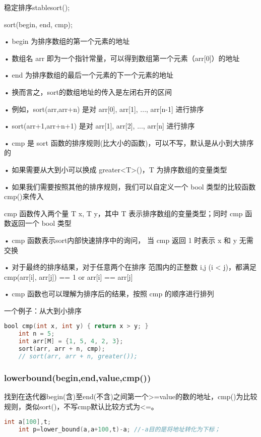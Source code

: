 \documentclass[UTF8]{ctexart}
\begin{document}
稳定排序stable\textunderscore sort();

sort(begin, end, cmp);

• begin 为排序数组的第一个元素的地址

• 数组名 arr 即为一个指针常量，可以得到数组第一个元素（arr[0]）的地址

• end 为排序数组的最后一个元素的下一个元素的地址

• 换而言之，sort的数组地址的传入是左闭右开的区间

• 例如，sort(arr,arr+n) 是对 arr[0], arr[1], ..., arr[n-1] 进行排序 

• sort(arr+1,arr+n+1) 是对 arr[1], arr[2], ..., arr[n] 进行排序 

• cmp 是 sort 函数的排序规则(比大小的函数)，可以不写，默认是从小到大排序的 

• 如果需要从大到小可以换成 greater<T>()，T 为排序数组的变量类型 

• 如果我们需要按照其他的排序规则，我们可以自定义一个 bool 类型的比较函数cmp()来传入

cmp 函数传入两个量 T x, T y，其中 T 表示排序数组的变量类型；同时 cmp 函数返回一个 bool 类型 

• cmp 函数表示sort内部快速排序中的询问， 当 cmp 返回 1 时表示 x 和 y 无需交换 

• 对于最终的排序结果，对于任意两个在排序 范围内的正整数 i,j (i < j)，都满足 cmp(arr[i], arr[j]) == 1 or arr[i] == arr[j] 

• cmp 函数也可以理解为排序后的结果，按照 cmp 的顺序进行排列

一个例子：从大到小排序 
\begin{lstlisting}[language = C,basicstyle=\small\ttfamily]
    bool cmp(int x, int y) { return x > y; }
    int n = 5; 
    int arr[M] = {1, 5, 4, 2, 3}; 
    sort(arr, arr + n, cmp); 
    // sort(arr, arr + n, greater());
\end{lstlisting}

\subsubsection{lower\textunderscore bound(begin,end,value,cmp())}
找到在迭代器begin(含)至end(不含)之间第一个>=value的数的地址，cmp()为比较规则，类似sort()，不写cmp默认比较方式为<=。
\begin{lstlisting}[language = C,basicstyle=\small\ttfamily]
    int a[100],t;
    int p=lower_bound(a,a+100,t)-a; //-a目的是将地址转化为下标；
\end{lstlisting}
\end{document}
